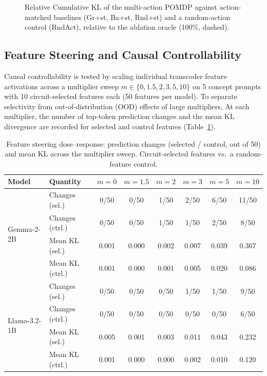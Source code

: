 \begin{figure}[H]
\centering

\caption{Relative Cumulative KL of the multi-action POMDP against
action-matched baselines (Gr+st, Ba+st, Rnd+st) and a random-action
control (RndAct), relative to the ablation oracle (100\%, dashed).}
\label{fig:rck}
\end{figure}

\subsection{Feature Steering and Causal Controllability}

Causal controllability is tested by scaling individual transcoder
feature activations across a multiplier sweep
$m \in \{0, 1.5, 2, 3, 5, 10\}$ on 5 concept prompts with 10
circuit-selected features each (50 features per model).  To separate
selectivity from out-of-distribution (OOD) effects of large
multipliers,   At
each multiplier, the number of top-token prediction changes
and the mean KL divergence are recorded for selected and control features
(Table~\ref{tab:steering}).

\begin{table}[H]
\centering
\caption{Feature steering dose--response: prediction changes
(selected / control, out of 50) and mean KL across the multiplier
sweep.  Circuit-selected features vs.\ a random-feature control.}
\label{tab:steering}
{\small
\begin{tabular}{llcccccc}
\toprule
\textbf{Model} & \textbf{Quantity} & \textbf{$m{=}0$} & \textbf{$m{=}1.5$} & \textbf{$m{=}2$} & \textbf{$m{=}3$} & \textbf{$m{=}5$} & \textbf{$m{=}10$} \\
\midrule
\multirow{4}{*}{Gemma-2-2B}
 & Changes (sel.)   & 0/50 & 0/50 & 1/50 & 2/50 & 6/50 & 11/50 \\
 & Changes (ctrl.)  & 0/50 & 0/50 & 1/50 & 1/50 & 2/50 & 8/50 \\
 & Mean KL (sel.)   & 0.001 & 0.000 & 0.002 & 0.007 & 0.039 & 0.367 \\
 & Mean KL (ctrl.)  & 0.001 & 0.000 & 0.001 & 0.005 & 0.020 & 0.086 \\
\midrule
\multirow{4}{*}{Llama-3.2-1B}
 & Changes (sel.)   & 0/50 & 0/50 & 0/50 & 1/50 & 1/50 & 9/50 \\
 & Changes (ctrl.)  & 0/50 & 0/50 & 0/50 & 0/50 & 0/50 & 6/50 \\
 & Mean KL (sel.)   & 0.005 & 0.001 & 0.003 & 0.011 & 0.043 & 0.232 \\
 & Mean KL (ctrl.)  & 0.001 & 0.000 & 0.000 & 0.002 & 0.010 & 0.120 \\
\bottomrule
\end{tabular}%
}
\end{table}

